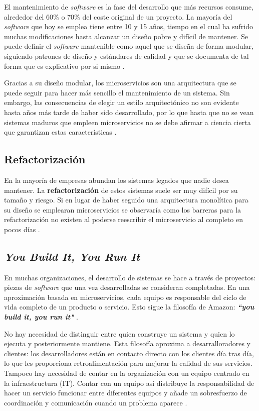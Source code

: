\documentclass[11pt,spanish,listoffigures]{tfgetsinf}
\begin{document}
El mantenimiento de \textit{software} es la fase del desarrollo que más recursos consume, alrededor del 60\% o 70\% del coste original de un proyecto. La mayoría del \textit{software} que hoy se emplea tiene entre 10 y 15 años, tiempo en el cual ha sufrido muchas modificaciones hasta alcanzar un diseño pobre y difícil de mantener. Se puede definir el \textit{software} mantenible como aquel que se diseña de forma modular, siguiendo patrones de diseño y estándares de calidad y que se documenta de tal forma que es explicativo por si mismo \cite{Pressman}.

Gracias a su diseño modular, los microservicios son una arquitectura que se puede seguir para hacer más sencillo el mantenimiento de un sistema. Sin embargo, las consecuencias de elegir un estilo arquitectónico no son evidente hasta años más tarde de haber sido desarrollado, por lo que hasta que no se vean sistemas maduros que empleen microservicios no se debe afirmar a ciencia cierta que garantizan estas características \cite{Lewis2014}.

\subsection{Refactorización}


En la mayoría de empresas abundan los sistemas legados que nadie desea mantener. La \textbf{refactorización} de estos sistemas suele ser muy difícil por su tamaño y riesgo. Si en lugar de haber seguido una arquitectura monolítica para su diseño se emplearan microservicios se observaría como los barreras para la refactorización no existen al poderse reescribir el microservicio al completo en pocos días \cite{Eaves2014}.

\subsection{\textit{You Build It, You Run It}}

En muchas organizaciones, el desarrollo de sistemas se hace a través de proyectos: piezas de \textit{software} que una vez desarrolladas se consideran completadas. En una aproximación basada en microservicios, cada equipo es responsable del ciclo de vida completo de un producto o servicio. Esto sigue la filosofía de Amazon: \textbf{\textit{``you build it, you run it"}} \cite{Lewis2014}.

No hay necesidad de distinguir entre quien construye un sistema y quien lo ejecuta y posteriormente mantiene. Esta filosofía aproxima a desarralloradores y clientes: los desarrolladores están en contacto directo con los clientes día tras día, lo que les proporciona retroalimentación para mejorar la calidad de sus servicios. Tampoco hay necesidad de contar en la organización con un equipo centrado en la infraestructura (IT). Contar con un equipo así distribuye la responsabilidad de hacer un servicio funcionar entre diferentes equipos y añade un sobresfuerzo de coordinación y comunicación cuando un problema aparece \cite{Vliet2011}.
\end{document}
